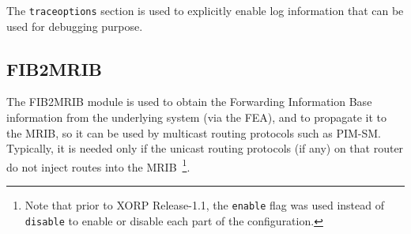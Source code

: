 \documentclass[11pt]{article}
\begin{document}
The {\tt traceoptions} section is used to explicitly enable log information
that can be used for debugging purpose.

\subsection{FIB2MRIB}
\label{sec:protocols:fib2mrib}

The FIB2MRIB module is used to obtain the Forwarding Information Base
information from the underlying system (via the FEA), and to propagate
it to the MRIB, so it can be used by multicast routing protocols
such as PIM-SM. Typically, it is needed only if the unicast routing
protocols (if any) on that router do not inject routes into the
MRIB~\footnote{Note that prior to XORP Release-1.1, the {\tt enable} flag
was used instead of {\tt disable} to enable or disable each part of the
configuration.}.


\vspace{0.1in}
\noindent{}
\vspace{0.1in}
\end{document}
